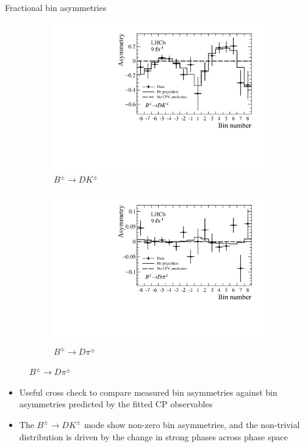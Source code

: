 \documentclass{beamer}
\begin{document}
\begin{frame}{Fractional bin asymmetries}
  \begin{figure}
    \centering
    \vspace{-0.2cm}
    \begin{subfigure}{0.5\textwidth}
      \includegraphics[width = 1.0\textwidth]{Plots/BinAsymmetries_dk.pdf}
      \caption{$B^\pm\to DK^\pm$}
    \end{subfigure}%
    \begin{subfigure}{0.5\textwidth}
      \includegraphics[width = 1.0\textwidth]{Plots/BinAsymmetries_dpi.pdf}
      \caption{$B^\pm\to D\pi^\pm$}
    \end{subfigure}
  \end{figure}
  \begin{itemize}
    \item{Useful cross check to compare measured bin asymmetries against bin asymmetries predicted by the fitted CP observables}
    \item{The $B^\pm\to DK^\pm$ mode show non-zero bin asymmetries, and the non-trivial distribution is driven by the change in strong phases across phase space}
  \end{itemize}
\end{frame}
\end{document}
